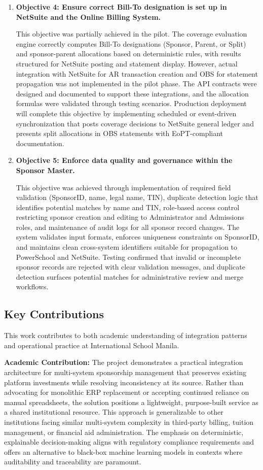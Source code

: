 \begin{enumerate}
    \item \textbf{Objective 4: Ensure correct Bill-To designation is set up in NetSuite and the Online Billing System.}
    
    This objective was partially achieved in the pilot. The coverage evaluation engine correctly computes Bill-To designations (Sponsor, Parent, or Split) and sponsor-parent allocations based on deterministic rules, with results structured for NetSuite posting and statement display. However, actual integration with NetSuite for AR transaction creation and OBS for statement propagation was not implemented in the pilot phase. The API contracts were designed and documented to support these integrations, and the allocation formulas were validated through testing scenarios. Production deployment will complete this objective by implementing scheduled or event-driven synchronization that posts coverage decisions to NetSuite general ledger and presents split allocations in OBS statements with EoPT-compliant documentation.
    
    \item \textbf{Objective 5: Enforce data quality and governance within the Sponsor Master.}
    
    This objective was achieved through implementation of required field validation (SponsorID, name, legal name, TIN), duplicate detection logic that identifies potential matches by name and TIN, role-based access control restricting sponsor creation and editing to Administrator and Admissions roles, and maintenance of audit logs for all sponsor record changes. The system validates input formats, enforces uniqueness constraints on SponsorID, and maintains clean cross-system identifiers suitable for propagation to PowerSchool and NetSuite. Testing confirmed that invalid or incomplete sponsor records are rejected with clear validation messages, and duplicate detection surfaces potential matches for administrative review and merge workflows.
\end{enumerate}

\subsection{Key Contributions}

This work contributes to both academic understanding of integration patterns and operational practice at International School Manila.

\textbf{Academic Contribution:} The project demonstrates a practical integration architecture for multi-system sponsorship management that preserves existing platform investments while resolving inconsistency at its source. Rather than advocating for monolithic ERP replacement or accepting continued reliance on manual spreadsheets, the solution positions a lightweight, purpose-built service as a shared institutional resource. This approach is generalizable to other institutions facing similar multi-system complexity in third-party billing, tuition management, or financial aid administration. The emphasis on deterministic, explainable decision-making aligns with regulatory compliance requirements and offers an alternative to black-box machine learning models in contexts where auditability and traceability are paramount.

